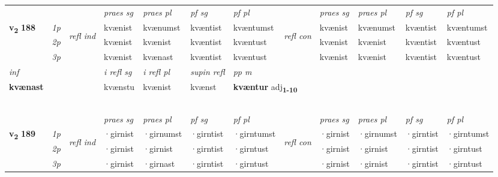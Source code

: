 \begin{longtable}[l]{X>{\footnotesize\itshape}llXXXXlXXXX}
\midrule

 & &   & \textit{praes sg}  & \textit{praes pl}    & \textit{ pf sg} & \textit{pf pl} & & \textit{praes sg}  & \textit{praes pl}    & \textit{pf sg} & \textit{pf pl }  \\ \cmidrule{4-7} \cmidrule{9-12}
 \multirow{2}{*}{{{\textbf{v{\textsubscript{2}}} \Large{\textbf{188}}}}}  & 1p & \multirow{3}{*}{\begin{turn}{90}\textit{refl ind}\end{turn}}  & kvænist & kvænumst & kvæntist & kvæntumst & \multirow{3}{*}{\begin{turn}{90}\textit{refl con}\end{turn}}  &kvænist & kvænumst & kvæntist & kvæntumst \\*
 & 2p &  & kvænist & kvænist & kvæntist & kvæntust & &kvænist & kvænist & kvæntist & kvæntust \\*
 & 3p  & & kvænist & kvænast & kvæntist & kvæntust & & kvænist & kvænist& kvæntist & kvæntust \\*
\cmidrule{4-7} \cmidrule{9-12}

   {\textit{inf}} & &   & \textit{i refl sg} & \textit{i refl pl}   & \textit{supin refl} & \textit{pp m} \\*
  {\textbf{kvænast}} & &   & kvænstu & kvænist   & kvænst & \multicolumn{2}{l}{\textbf{kvæntur} adj\textbf{\textsubscript{1-10}}} \\*

\midrule
  & \\*
   & \\*
     & \\*
   & \\*
  & \\
   \midrule
 & &   & \textit{praes sg}  & \textit{praes pl}    & \textit{ pf sg} & \textit{pf pl} & & \textit{praes sg}  & \textit{praes pl}    & \textit{pf sg} & \textit{pf pl }  \\ \cmidrule{4-7} \cmidrule{9-12}
 \multirow{2}{*}{{{\textbf{v{\textsubscript{2}}} \Large{\textbf{189}}}}}  & 1p & \multirow{3}{*}{\begin{turn}{90}\textit{refl ind}\end{turn}}  & ·girnist & ·girnumst & ·girntist & ·girntumst & \multirow{3}{*}{\begin{turn}{90}\textit{refl con}\end{turn}}  &·girnist & ·girnumst & ·girntist & ·girntumst \\*
 & 2p &  & ·girnist & ·girnist & ·girntist & ·girntust & &·girnist & ·girnist & ·girntist & ·girntust \\*
 & 3p  & & ·girnist & ·girnast & ·girntist & ·girntust & & ·girnist & ·girnist& ·girntist & ·girntust \\*
\cmidrule{4-7} \cmidrule{9-12}


\end{longtable}
